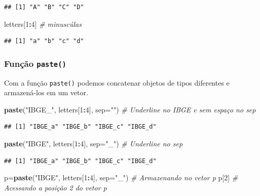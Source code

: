 \documentclass[
]{book}
\newenvironment{Shaded}{\begin{snugshade}}{\end{snugshade}}
\newcommand{\CommentTok}[1]{\textcolor[rgb]{0.56,0.35,0.01}{\textit{#1}}}
\newcommand{\DataTypeTok}[1]{\textcolor[rgb]{0.13,0.29,0.53}{#1}}
\newcommand{\DecValTok}[1]{\textcolor[rgb]{0.00,0.00,0.81}{#1}}
\newcommand{\KeywordTok}[1]{\textcolor[rgb]{0.13,0.29,0.53}{\textbf{#1}}}
\newcommand{\NormalTok}[1]{#1}
\newcommand{\OperatorTok}[1]{\textcolor[rgb]{0.81,0.36,0.00}{\textbf{#1}}}
\newcommand{\StringTok}[1]{\textcolor[rgb]{0.31,0.60,0.02}{#1}}
\theoremstyle{definition}
\theoremstyle{definition}
\theoremstyle{definition}
\theoremstyle{remark}
\begin{document}
\begin{verbatim}
## [1] "A" "B" "C" "D"
\end{verbatim}

\begin{Shaded}
\begin{Highlighting}[]
\NormalTok{letters[}\DecValTok{1}\OperatorTok{:}\DecValTok{4}\NormalTok{] }\CommentTok{# minuscúlas}
\end{Highlighting}
\end{Shaded}

\begin{verbatim}
## [1] "a" "b" "c" "d"
\end{verbatim}

\hypertarget{funuxe7uxe3o-paste}{%
\subsubsection{\texorpdfstring{Função \texttt{paste()}}{Função paste()}}\label{funuxe7uxe3o-paste}}

Com a função \texttt{paste()} podemos concatenar objetos de tipos diferentes e armazená-los em um vetor.

\begin{Shaded}
\begin{Highlighting}[]
\KeywordTok{paste}\NormalTok{(}\StringTok{"IBGE_"}\NormalTok{, letters[}\DecValTok{1}\OperatorTok{:}\DecValTok{4}\NormalTok{], }\DataTypeTok{sep=}\StringTok{""}\NormalTok{)   }\CommentTok{# Underline no IBGE e sem espaço no sep}
\end{Highlighting}
\end{Shaded}

\begin{verbatim}
## [1] "IBGE_a" "IBGE_b" "IBGE_c" "IBGE_d"
\end{verbatim}

\begin{Shaded}
\begin{Highlighting}[]
\KeywordTok{paste}\NormalTok{(}\StringTok{"IBGE"}\NormalTok{, letters[}\DecValTok{1}\OperatorTok{:}\DecValTok{4}\NormalTok{], }\DataTypeTok{sep=}\StringTok{"_"}\NormalTok{)   }\CommentTok{# Underline no sep}
\end{Highlighting}
\end{Shaded}

\begin{verbatim}
## [1] "IBGE_a" "IBGE_b" "IBGE_c" "IBGE_d"
\end{verbatim}

\begin{Shaded}
\begin{Highlighting}[]
\NormalTok{p=}\KeywordTok{paste}\NormalTok{(}\StringTok{"IBGE"}\NormalTok{, letters[}\DecValTok{1}\OperatorTok{:}\DecValTok{4}\NormalTok{], }\DataTypeTok{sep=}\StringTok{"_"}\NormalTok{) }\CommentTok{# Armazenando no vetor p}
\NormalTok{p[}\DecValTok{2}\NormalTok{]                                    }\CommentTok{# Acessando a posição 2 do vetor p}
\end{Highlighting}
\end{Shaded}
\end{document}
